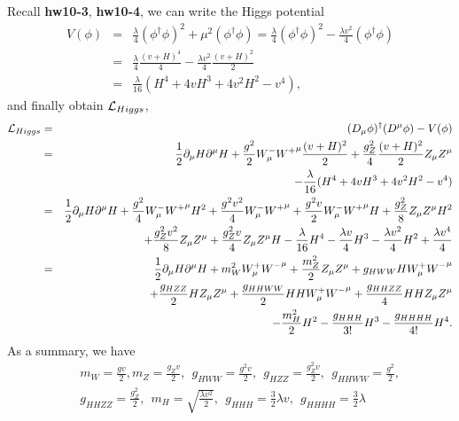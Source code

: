 \documentclass[11pt]{article}
\def\del{{\partial}}
\begin{document}
Recall {\bf hw10-3}, {\bf hw10-4}, we can write the Higgs potential
\begin{eqnarray}
    V(\phi) &=& \frac{\lambda}{4} (\phi^\dagger \phi)^2 + \mu^2 (\phi^\dagger \phi) 
    =\frac{\lambda}{4} (\phi^\dagger \phi)^2 - \frac{\lambda v^2}{4}(\phi^\dagger \phi) \\
    &=& \frac{\lambda}{4} \frac{(v+H)^4}{4} - \frac{\lambda v^2}{4}\frac{(v+H)^2}{2} \\
    &=& \frac{\lambda}{16}(H^4+4vH^3+4v^2H^2-v^4),
\end{eqnarray}
and finally obtain ${\cal L}_{Higgs}$,
\begin{eqnarray}
    {\cal L}_{Higgs} &=& (D_\mu \phi)^\dagger (D^\mu \phi) - V(\phi) \\ 
    &=& \frac{1}{2}\del_\mu H \del^\mu H + \frac{g^2}{2}W_\mu^-{W^+}^\mu \frac{(v+H)^2}{2}+\frac{g_Z^2}{4} \frac{(v+H)^2}{2} Z_\mu Z^\mu \nonumber \\ &&- \frac{\lambda}{16}(H^4+4vH^3+4v^2H^2-v^4) \\
    &=& \frac{1}{2}\del_\mu H \del^\mu H + \frac{g^2}{4}W_\mu^-{W^+}^\mu H^2 + \frac{g^2v^2}{4}W_\mu^-{W^+}^\mu +\frac{g^2v}{2}W_\mu^-{W^+}^\mu H +\frac{g_Z^2}{8}Z_\mu Z^\mu H^2 \nonumber \\ && +\frac{g_Z^2v^2}{8}Z_\mu Z^\mu +\frac{g_Z^2 v}{4}Z_\mu Z^\mu H- \frac{\lambda}{16}H^4-\frac{\lambda v}{4}H^3-\frac{\lambda v^2}{4}H^2+  \frac{\lambda v^4}{4} \\ 
    &=& \frac{1}{2} \del_\mu H \del^\mu H+
                m_W^2 W^+_\mu {W^-}^\mu
                + \frac{m_Z^2}{2} Z_\mu Z^\mu
                + g_{HWW} H W^+_\mu {W^-}^\mu
                \nonumber \\ &&+ \frac{g_{HZZ}}{2} H Z_\mu Z^\mu
                + \frac{g_{HHWW}}{2} HH W^+_\mu {W^-}^\mu
                + \frac{g_{HHZZ}}{4} HH Z_\mu Z^\mu
                \nonumber \\ &&- \frac{m_H^2}{2} H^2
                - \frac{g_{HHH}}{3!} H^3
                - \frac{g_{HHHH}}{4!} H^4.
\end{eqnarray}
As a summary, we have
\begin{eqnarray}
    &&m_W= \frac{gv}{2}, m_Z=\frac{g_Zv}{2},~~ g_{HWW}=\frac{g^2v}{2},~~g_{HZZ}=\frac{g_Z^2v}{2},~~g_{HHWW}= \frac{g^2}{2},\\
    && g_{HHZZ}=\frac{g_Z^2}{2},~~m_H=\sqrt{\frac{\lambda v^2}{2}},~~g_{HHH}=\frac{3}{2} \lambda v,~~g_{HHHH}=\frac{3}{2} \lambda
\end{eqnarray}
\end{document}
